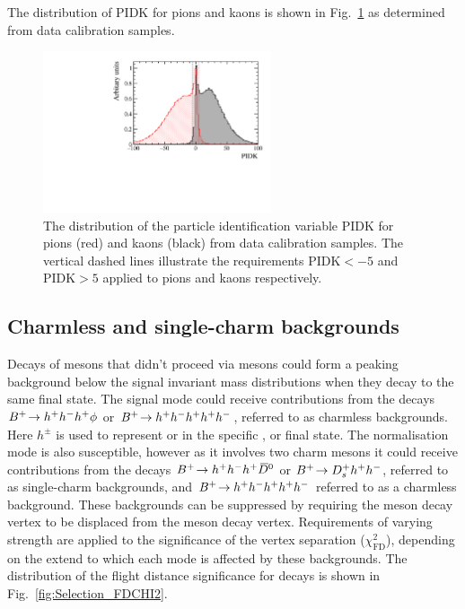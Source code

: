 The distribution of PIDK for pions and kaons is shown in Fig.~\ref{fig:selection_PIDK_distribution} as determined from data calibration samples.
\begin{figure}[!h]
    \centering
        \includegraphics[width=0.6\textwidth]{figs/Selection/Calib_sample_PIDK.pdf}
        \caption{The distribution of the particle identification variable PIDK for pions (red) and kaons (black) from data calibration samples. The vertical dashed lines illustrate the requirements $\text{PIDK}<-5$ and $\text{PIDK}>5$ applied to pions and kaons respectively.}
    \label{fig:selection_PIDK_distribution}   
\end{figure}





\subsection{Charmless and single-charm backgrounds}


Decays of \Bp mesons that didn't proceed via \D mesons could form a peaking background below the signal invariant mass distributions when they decay to the same final state.
The signal mode could receive contributions from the decays ${{{B}^+}}\!\rightarrow h^{+}h^{-}h^{+}\phi$ or ${{{B}^+}}\!\rightarrow h^{+}h^{-}h^{+}h^{+}h^{-}$, referred to as charmless backgrounds. Here $h^{\pm}$ is used to represent \Kpm or \pipm in the specific \Dsp, \Dzb or \phiz final state.
The normalisation mode is also susceptible, however as it involves two charm mesons it could receive contributions from the decays ${{{B}^+}}\!\rightarrow h^{+}h^{-}h^{+}{{\kern 0.2em\overline{\kern -0.2em D}{}}{}^0}$ or ${{{B}^+}}\!\rightarrow {\ensuremath{{D}^+_{s}}} h^{+}h^{-}$, referred to as single-charm backgrounds, and ${{{B}^+}}\!\rightarrow h^{+}h^{-}h^{+} h^{+}h^{-}$ referred to as a charmless background.
These backgrounds can be suppressed by requiring the \D meson decay vertex to be displaced from the \Bp meson decay vertex. Requirements of varying strength are applied to the significance of the vertex separation ($\chi^{2}_{\text{FD}}$), depending on the extend to which each mode is affected by these backgrounds. The distribution of the flight distance significance for \decay{\Bp}{(\decay{\Dsp}{\Kp\pim\pip})\phiz} decays is shown in Fig.~\ref{fig:Selection_FDCHI2}.

